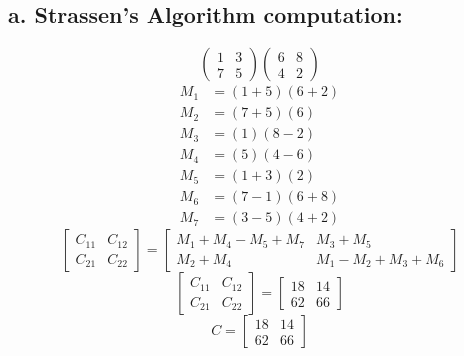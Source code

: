 \documentclass{article}
\begin{document}
    \subsection*{a. Strassen's Algorithm computation:}
    \[
        \begin{pmatrix}
            1 & 3 \\
            7 & 5
        \end{pmatrix}
        \begin{pmatrix}
            6 & 8 \\
            4 & 2
        \end{pmatrix}
    \]
    \begin{subequations}
        \begin{align}
        M_1 &= (1 + 5)(6 + 2) \\
        M_2 &= (7 + 5)(6) \\
        M_3 &= (1)(8 - 2) \\
        M_4 &= (5)(4 - 6) \\
        M_5 &= (1 + 3)(2) \\
        M_6 &= (7 - 1)(6 + 8) \\
        M_7 &= (3 - 5)(4 + 2)
        \end{align}
    \end{subequations}
    \[
      \begin{bmatrix}
        C_{11} & C_{12} \\
        C_{21} & C_{22}
      \end{bmatrix}
      =
      \begin{bmatrix}
        M_1 + M_4 - M_5 + M_7 & M_3 + M_5 \\
        M_2 + M_4 & M_1 - M_2 + M_3 + M_6
      \end{bmatrix}
    \]
    \[
      \begin{bmatrix}
        C_{11} & C_{12} \\
        C_{21} & C_{22}
      \end{bmatrix}
      =
      \begin{bmatrix}
        18 & 14 \\
        62 & 66
      \end{bmatrix}
    \]
    \[
      C
      =
      \begin{bmatrix}
        18 & 14 \\
        62 & 66
      \end{bmatrix}
    \]
\end{document}
